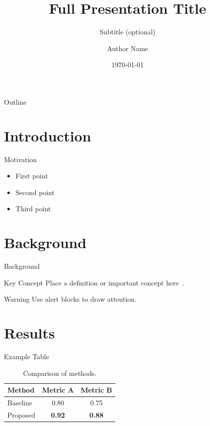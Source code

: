 \documentclass[aspectratio=169]{beamer}
\title[Short Title]{Full Presentation Title}
\subtitle{Subtitle (optional)}
\author[Author]{Author Name}
\institute[Org]{Organization / Department}
\date{\today}
\begin{document}
\begin{frame}
    \titlepage
\end{frame}

\begin{frame}{Outline}
    \tableofcontents
\end{frame}

\section{Introduction}

\begin{frame}{Motivation}
    \begin{itemize}
        \item First point
        \item Second point
        \item Third point
    \end{itemize}
\end{frame}

\section{Background}

\begin{frame}{Background}
    \begin{block}{Key Concept}
        Place a definition or important concept here~\cite{book:571187}.
    \end{block}

    \begin{alertblock}{Warning}
        Use alert blocks to draw attention.
    \end{alertblock}
\end{frame}

\section{Results}

\begin{frame}{Example Table}
    \begin{table}
        \centering
        \begin{tabular}{lcc}
            \toprule
            Method & Metric A & Metric B \\
            \midrule
            Baseline & 0.80 & 0.75 \\
            Proposed & \textbf{0.92} & \textbf{0.88} \\
            \bottomrule
        \end{tabular}
        \caption{Comparison of methods.}
    \end{table}
\end{frame}
\end{document}
